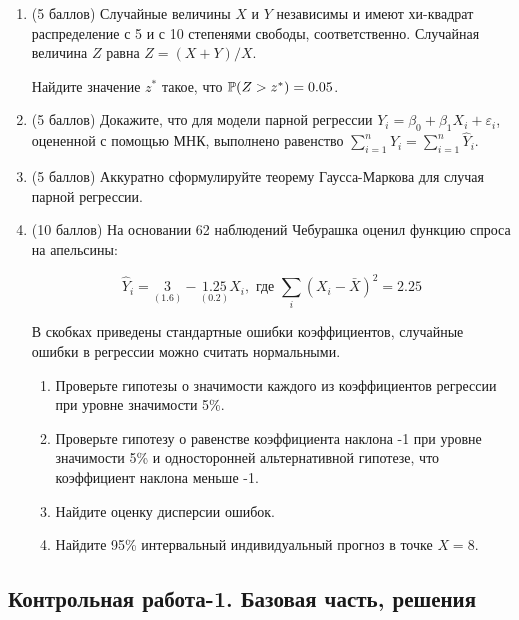 \begin{enumerate}
  \item (5 баллов) Случайные величины $X$ и $Y$ независимы и имеют хи-квадрат распределение
  с 5 и с 10 степенями свободы, соответственно. Случайная величина $Z$ равна $Z = (X+Y)/X$.

  Найдите значение $z^*$ такое, что $\P(Z > z^*)=0.05$.
  \item (5 баллов) Докажите, что для модели парной регрессии $Y_i = \beta_0 + \beta_1 X_i + \varepsilon_i$,
оцененной с помощью МНК, выполнено равенство $\sum_{i=1}^n Y_i = \sum_{i=1}^n \hat Y_i$.

  \item (5 баллов) Аккуратно сформулируйте теорему Гаусса-Маркова для случая парной регрессии.

  \item (10 баллов) На основании 62 наблюдений Чебурашка оценил функцию спроса на апельсины:

 \[
 \hat Y_i = \underset{(1.6)}{3} - \underset{(0.2)}{1.25} X_i, \text{ где } \sum_i (X_i - \bar X)^2 =2.25
 \]

 В скобках приведены стандартные ошибки коэффициентов, случайные ошибки в регрессии можно считать нормальными.


  \begin{enumerate}
    \item Проверьте гипотезы о значимости каждого из коэффициентов регрессии при уровне значимости 5\%.
    \item Проверьте гипотезу о равенстве коэффициента наклона -1 при уровне значимости 5\%
    и односторонней альтернативной гипотезе, что коэффициент наклона меньше -1.
    \item Найдите оценку дисперсии ошибок.
    \item Найдите 95\% интервальный индивидуальный прогноз в точке $X=8$.
  \end{enumerate}
\end{enumerate}

\subsection{Контрольная работа-1. Базовая часть, решения}

